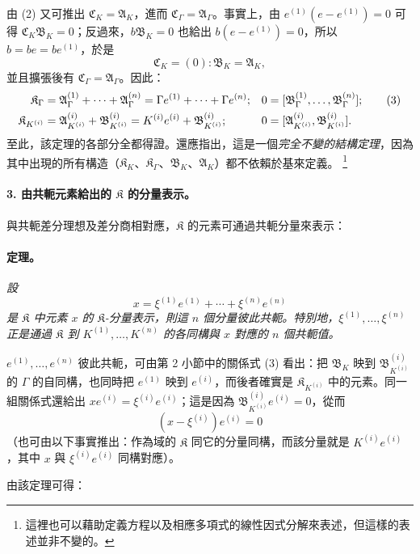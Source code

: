\documentclass[11pt]{article}
\providecommand{\srcfn}[2]{%
  \begingroup
  \renewcommand{\thefootnote}{#1}%
  \footnote{#2}%
  \addtocounter{footnote}{-1}%
  \endgroup}
\begin{document}
由 (2) 又可推出 $\mathfrak C_K=\mathfrak A_K$，進而 $\mathfrak C_\Gamma=\mathfrak A_\Gamma$。事實上，由 $e^{(1)}(e-e^{(1)})=0$ 可得 $\mathfrak C_K\mathfrak B_K=0$；反過來，$b\mathfrak B_K=0$ 也給出 $b(e-e^{(1)})=0$，所以 $b=be=be^{(1)}$，於是
\[
\mathfrak C_K=(0):\mathfrak B_K=\mathfrak A_K,
\]
並且擴張後有 $\mathfrak C_\Gamma=\mathfrak A_\Gamma$。因此：
\begin{align}
\mathfrak K_\Gamma
&=\mathfrak A_\Gamma^{(1)}+\cdots+\mathfrak A_\Gamma^{(n)}
=\Gamma e^{(1)}+\cdots+\Gamma e^{(n)};
&0&=[\mathfrak B_\Gamma^{(1)},\ldots,\mathfrak B_\Gamma^{(n)}]; \tag{3}\\
\mathfrak K_{K^{(i)}}
&=\mathfrak A_{K^{(i)}}^{(i)}+\mathfrak B_{K^{(i)}}^{(i)}
=K^{(i)}e^{(i)}+\mathfrak B_{K^{(i)}}^{(i)};
&0&=[\mathfrak A_{K^{(i)}}^{(i)},\mathfrak B_{K^{(i)}}^{(i)}].\notag
\end{align}
至此，該定理的各部分全都得證。還應指出，這是一個\emph{完全不變的結構定理}，因為其中出現的所有構造（$\mathfrak K_K$、$\mathfrak K_\Gamma$、$\mathfrak B_K$、$\mathfrak A_K$）都不依賴於基來定義。\srcfn{18)}{這裡也可以藉助定義方程以及相應多項式的線性因式分解來表述，但這樣的表述並非不變的。}

\paragraph{3. 由共軛元素給出的 $\mathfrak K$ 的分量表示。}
與共軛差分理想及差分商相對應，$\mathfrak K$ 的元素可通過共軛分量來表示：

\paragraph{定理。}
\emph{設
\[
x=\xi^{(1)}e^{(1)}+\cdots+\xi^{(n)}e^{(n)}
\]
是 $\mathfrak K$ 中元素 $x$ 的 $\mathfrak K$-分量表示，則這 $n$ 個分量彼此共軛。特別地，$\xi^{(1)},\ldots,\xi^{(n)}$ 正是通過 $\mathfrak K$ 到 $K^{(1)},\ldots,K^{(n)}$ 的各同構與 $x$ 對應的 $n$ 個共軛值。}

$e^{(1)},\ldots,e^{(n)}$ 彼此共軛，可由第 2 小節中的關係式 (3) 看出：把 $\mathfrak B_K$ 映到 $\mathfrak B_{K^{(i)}}^{(i)}$ 的 $\Gamma$ 的自同構，也同時把 $e^{(1)}$ 映到 $e^{(i)}$，而後者確實是 $\mathfrak K_{K^{(i)}}$ 中的元素。同一組關係式還給出 $xe^{(i)}=\xi^{(i)}e^{(i)}$；這是因為 $\mathfrak B_{K^{(i)}}^{(i)}e^{(i)}=0$，從而
\[
(x-\xi^{(i)})e^{(i)}=0
\]
（也可由以下事實推出：作為域的 $\mathfrak K$ 同它的分量同構，而該分量就是 $K^{(i)}e^{(i)}$，其中 $x$ 與 $\xi^{(i)}e^{(i)}$ 同構對應）。

由該定理可得：
\end{document}
